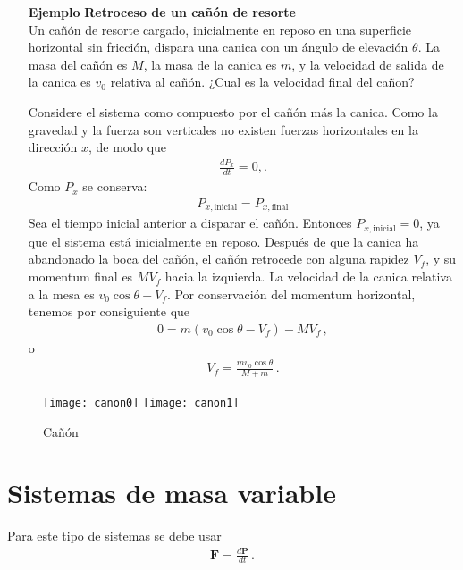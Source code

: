 \begin{itemize}
\item[\textbf{Ejemplo}] \textbf{Retroceso de un cañón de resorte}\\
Un cañón de resorte cargado, inicialmente en reposo en una superficie horizontal sin fricción, dispara una canica con un ángulo de elevación $\theta$. La masa del cañón es $M$, la masa de la canica es $m$, y la velocidad de salida de la canica es $v_0$ relativa al cañón. ¿Cual es la velocidad final del cañon?

Considere el sistema como compuesto por el cañón más la canica. Como la gravedad y la fuerza son verticales no existen fuerzas horizontales en la dirección $x$, de modo que
\begin{align}
  \frac{d P_x}{dt}=0,.
\end{align}
Como $P_x$ se conserva:
\begin{align}
  P_{x,\text{inicial}}=P_{x,\text{final}}
\end{align}
Sea el tiempo inicial anterior a disparar el cañón. Entonces $P_{x,\text{inicial}}=0$, ya que el sistema está inicialmente en reposo. Después de que la canica ha abandonado la boca del cañón, el cañón retrocede con alguna rapidez $V_f$, y su momentum final es $M V_f$ hacia la izquierda. La velocidad de la canica relativa a la  mesa es $v_0\cos\theta-V_f$. Por conservación del momentum horizontal, tenemos por consiguiente que
\begin{align}
  0=m(v_0\cos\theta-V_f)-M V_f\,,
\end{align}
o
\begin{align}
  V_f=\frac{m v_0\cos\theta}{M+m}\,.
\end{align}

\end{itemize}

\begin{frame}
  \begin{figure}
    \centering
{\texttt{[image: canon0]}}
{\texttt{[image: canon1]}}
    \caption{Cañón}
    \label{fig:canon}
  \end{figure}
\end{frame}


\section{Sistemas de masa variable}
Para este tipo de sistemas se debe usar
\begin{align}
  \mathbf{F}=\frac{d\mathbf{P}}{dt}\,.
\end{align}

